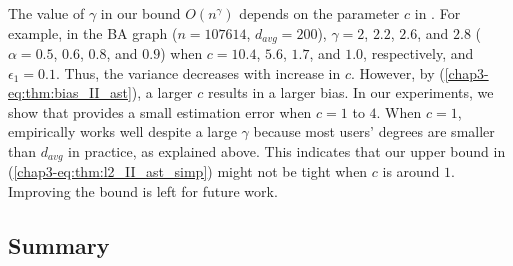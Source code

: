 The value of $\gamma$ in our bound $O(n^\gamma)$ depends on the parameter $c$ in \AlgWSTriVR{}.
For example, in the BA graph ($n=107614$, $d_{avg} = 200$), $\gamma=2$, $2.2$, $2.6$, and $2.8$ ($\alpha=0.5$, $0.6$, $0.8$, and $0.9$) when $c=10.4$, $5.6$, $1.7$, and $1.0$, respectively, and $\epsilon_1=0.1$.
Thus, the variance decreases with increase in $c$.
However, by (\ref{chap3-eq:thm:bias_II_ast}), a larger $c$ results in a larger bias. 
In our experiments, we show that \AlgWSTriVR{} provides a small estimation error when $c=1$ to $4$.
When $c=1$, \AlgWSTriVR{} empirically works well despite a large $\gamma$ because most users' degrees are smaller than $d_{avg}$ in practice, as explained above.
This indicates that our upper bound in (\ref{chap3-eq:thm:l2_II_ast_simp}) might not be tight when $c$ is around $1$.
Improving the bound is left for future work.



\subsection{Summary}
\label{chap3-sub:summary}

